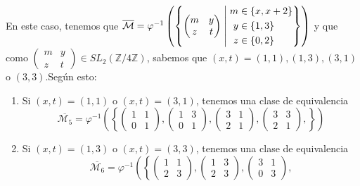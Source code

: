 \documentclass{article}
\newcommand{\suchthat}{\;\ifnum\currentgrouptype=16 \middle\fi|\;}
\begin{document}
\begin{enumerate}
		En este caso, tenemos que 
		$
		\overline{\mathcal{M}} =
		\varphi^{-1}\left( 
		\left\{
		\begin{pmatrix}
		m & y \\
		z & t
		\end{pmatrix}
		\suchthat
		\begin{aligned}
		m &\in \{x, x+2\} \\
		y &\in \{1, 3\} \\
		z &\in \{0, 2\} 
		\end{aligned}
		\right\}	
		\right)$ y que como 
		$ \begin{pmatrix}
		m & y \\
		z & t 
		\end{pmatrix} 
		\in SL_2(\mathbb{Z}/ 4\mathbb{Z}) $, sabemos que $(x, t) = (1,1), (1,3), (3,1) $ o $ (3,3)$.\newline Según esto:
		\begin{enumerate}
			\item Si $(x,t) = (1,1)$ o $(x,t) = (3,1)$, tenemos una clase de equivalencia 
			$$
			\overline{\mathcal{M}_{5}} = 
			\varphi^{-1}\left( 
			\left\{
			\begin{pmatrix}
			1 & 1 \\
			0 & 1 
			\end{pmatrix},
			\begin{pmatrix}
			1 & 3 \\
			0 & 1 
			\end{pmatrix},
			\begin{pmatrix}
			3 & 1 \\
			2 & 1 
			\end{pmatrix},
			\begin{pmatrix}
			3 & 3 \\
			2 & 1 
			\end{pmatrix},
			\right\}	
			\right) $$
			\item Si $(x,t) = (1,3)$ o $(x,t) = (3,3)$, tenemos una clase de equivalencia 
			$$
			\overline{\mathcal{M}_{6}} = 
			\varphi^{-1}\left( 
			\left\{
			\begin{pmatrix}
			1 & 1 \\
			2 & 3 
			\end{pmatrix},
			\begin{pmatrix}
			1 & 3 \\
			2 & 3 
			\end{pmatrix},
			\begin{pmatrix}
			3 & 1 \\
			0 & 3 
			\end{pmatrix},
$$
\end{enumerate}
\end{enumerate}
\end{document}
